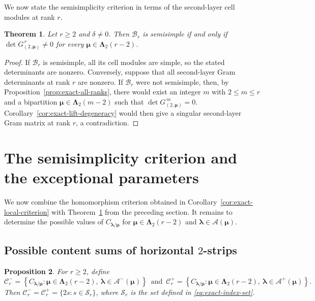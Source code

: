 \documentclass[10pt,a4paper]{amsart}
\newtheorem{theorem}{Theorem}[section]
\newtheorem{proposition}[theorem]{Proposition}
\newcommand{\1}{\mathfrak{1}}
\newcommand{\B}{\mathcal{B}}
\begin{document}
We now state the semisimplicity criterion in terms of
the second-layer cell modules at rank $r$.

\begin{theorem}\label{thm:exact-deciding-layer}
Let $r\geq2$ and $\delta\neq0$.
Then $\B_r$ is semisimple if and only if
$\det G_{(2,\bm\mu)}^{\,r}\neq0$ for every
$\bm\mu\in\bm\Lambda_2(r-2)$.
\end{theorem}

\begin{proof}
If $\B_r$ is semisimple, all its cell modules are
simple, so the stated determinants are nonzero.
Conversely, suppose that all second-layer Gram
determinants at rank $r$ are nonzero.
If $\B_r$ were not semisimple, then, by
Proposition~\ref{prop:exact-all-ranks}, there would
exist an integer $m$ with $2\leq m\leq r$ and
a bipartition $\bm\mu\in\bm\Lambda_2(m-2)$ such that
$\det G_{(2,\bm\mu)}^{\,m}=0$.
Corollary~\ref{cor:exact-lift-degeneracy} would then
give a singular second-layer Gram matrix at rank $r$,
a contradiction.
\end{proof}

\section{The semisimplicity criterion and the exceptional parameters}
\label{sec:semisimplicity-criterion}

We now combine the homomorphism criterion obtained in Corollary~\ref{cor:exact-local-criterion} with Theorem~\ref{thm:exact-deciding-layer} from the preceding section. It remains to determine the possible values of $C_{\bm\lambda/\bm\mu}$ for $\bm\mu\in\bm\Lambda_2(r-2)$ and
$\bm\lambda\in\mathcal A(\bm\mu)$.

\subsection{Possible content sums of horizontal $2$-strips}

\begin{proposition}\label{prop:exact-content-spectrum}
For $r\geq2$, define
\begin{equation*}
\mathcal C_r^-=
\left\{
C_{\bm\lambda/\bm\mu}:
\bm\mu\in\bm\Lambda_2(r-2),\
\bm\lambda\in\mathcal A^-(\bm\mu)
\right\}
\,\text{ and }\,
\mathcal C_r^+=
\left\{
C_{\bm\lambda/\bm\mu}:
\bm\mu\in\bm\Lambda_2(r-2),\
\bm\lambda\in\mathcal A^+(\bm\mu)
\right\}.
\end{equation*}
Then $\mathcal C_r^-=\mathcal C_r^+=
\{2s:s\in\mathscr S_r\}$, where $\mathscr S_r$
is the set defined in \eqref{eq:exact-index-set}.
\end{proposition}
\end{document}
